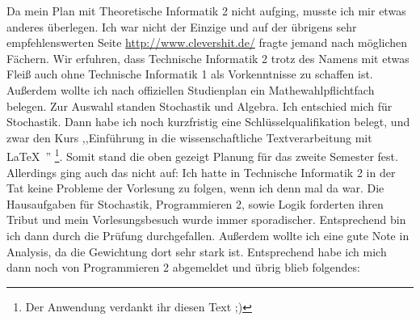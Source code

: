 Da mein Plan mit Theoretische Informatik 2 nicht aufging, musste ich
mir etwas anderes überlegen. Ich war nicht der Einzige und auf der
übrigens sehr empfehlenswerten Seite \url{http://www.clevershit.de/}
fragte jemand nach möglichen Fächern. Wir erfuhren, dass Technische
Informatik 2 trotz des Namens mit etwas Fleiß auch ohne Technische
Informatik 1 als Vorkenntnisse zu schaffen ist. Außerdem wollte ich
nach offiziellen Studienplan ein Mathewahlpflichtfach belegen. Zur
Auswahl standen Stochastik und Algebra. Ich entschied mich für
Stochastik. Dann habe ich  noch kurzfristig eine
Schlüsselqualifikation belegt, und zwar den Kurs ,,Einführung in die
wissenschaftliche Textverarbeitung mit \LaTeX\ '' \footnote{Der
  Anwendung verdankt ihr diesen Text ;)}.%
Somit stand die oben gezeigt Planung für das zweite Semester fest.
Allerdings ging auch das nicht auf: Ich hatte in Technische Informatik
2 in der Tat keine Probleme der Vorlesung zu folgen, wenn ich denn mal
da war. Die Hausaufgaben für Stochastik, Programmieren 2, sowie Logik
forderten ihren Tribut und mein Vorlesungsbesuch wurde immer
sporadischer. Entsprechend bin ich dann durch die Prüfung
durchgefallen. Außerdem wollte ich eine gute Note in Analysis, da die
Gewichtung dort sehr stark ist. Entsprechend habe ich mich dann noch
von Programmieren 2 abgemeldet und übrig blieb folgendes:


